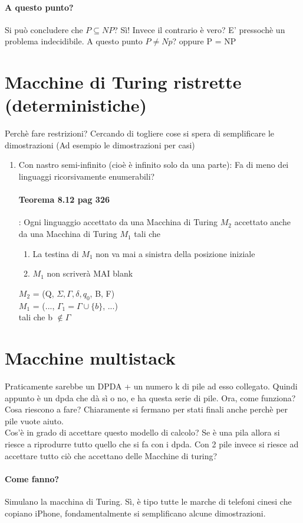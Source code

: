 \documentclass[12pt, a4paper, openany, oneside]{book}
\begin{document}
\paragraph{A questo punto?} Si può concludere che $P \subseteq NP$? Sì! Invece il
contrario è vero? E' pressochè un problema indecidibile. A questo punto $P \neq Np$?
oppure P = NP
\section{Macchine di Turing ristrette (deterministiche)}
Perchè fare restrizioni? Cercando di togliere cose si spera di semplificare le 
dimostrazioni (Ad esempio le dimostrazioni per casi)
\begin{enumerate}
	\item Con nastro semi-infinito (cioè è infinito solo da una parte): Fa di meno
	dei linguaggi ricorsivamente enumerabili?
	\paragraph{Teorema 8.12 pag 326}: Ogni linguaggio accettato da una Macchina
	di Turing $M_{2}$ accettato anche da una Macchina di Turing $M_{1}$ tali che
	\begin{enumerate}
		\item La testina di $M_{1}$ non va mai a sinistra della posizione iniziale
		\item $M_{1}$ non scriverà MAI blank
	\end{enumerate}
	$M_{2}$ = (Q, $\Sigma, \Gamma, \delta, q_{0}$, B, F)\\
	$M_{1}$ = (..., $\Gamma_{1} = \Gamma \cup \{b\}$, ...)\\
	tali che b $\notin \Gamma$
\end{enumerate}
\section{Macchine multistack}
Praticamente sarebbe un DPDA + un numero k di pile ad esso collegato. Quindi appunto
è un dpda che dà sì o no, e ha questa serie di pile. Ora, come funziona? Cosa 
riescono a fare? Chiaramente si fermano per stati finali anche perchè per pile
vuote aiuto. \\
Cos'è in grado di accettare questo modello di calcolo? Se è una pila allora 
si riesce a riprodurre tutto quello che si fa con i dpda. Con 2 pile invece
si riesce ad accettare tutto ciò che accettano delle Macchine di turing?
\paragraph{Come fanno?} Simulano la macchina di Turing. Sì, è tipo tutte le marche
di telefoni cinesi che copiano iPhone, fondamentalmente si semplificano alcune
dimostrazioni. 
\end{document}
